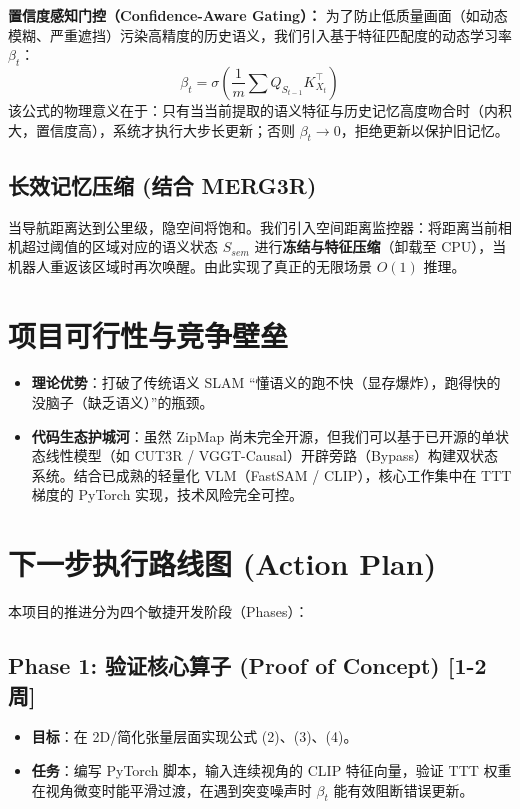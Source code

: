 \documentclass[12pt, a4paper]{article}
\begin{document}
\textbf{置信度感知门控（Confidence-Aware Gating）：}
为了防止低质量画面（如动态模糊、严重遮挡）污染高精度的历史语义，我们引入基于特征匹配度的动态学习率 $\beta_t$：
\begin{equation}
    \beta_t = \sigma \left( \frac{1}{m} \sum Q_{S_{t-1}} K_{X_t}^\top \right)
\end{equation}
该公式的物理意义在于：只有当当前提取的语义特征与历史记忆高度吻合时（内积大，置信度高），系统才执行大步长更新；否则 $\beta_t \to 0$，拒绝更新以保护旧记忆。



\subsection{长效记忆压缩 (结合 MERG3R)}
当导航距离达到公里级，隐空间将饱和。我们引入空间距离监控器：将距离当前相机超过阈值的区域对应的语义状态 $S_{sem}$ 进行\textbf{冻结与特征压缩}（卸载至 CPU），当机器人重返该区域时再次唤醒。由此实现了真正的无限场景 $O(1)$ 推理。

\section{项目可行性与竞争壁垒}
\begin{itemize}
    \item \textbf{理论优势}：打破了传统语义 SLAM “懂语义的跑不快（显存爆炸），跑得快的没脑子（缺乏语义）”的瓶颈。
    \item \textbf{代码生态护城河}：虽然 ZipMap 尚未完全开源，但我们可以基于已开源的单状态线性模型（如 CUT3R / VGGT-Causal）开辟旁路（Bypass）构建双状态系统。结合已成熟的轻量化 VLM（FastSAM / CLIP），核心工作集中在 TTT 梯度的 PyTorch 实现，技术风险完全可控。
\end{itemize}

\section{下一步执行路线图 (Action Plan)}

本项目的推进分为四个敏捷开发阶段（Phases）：

\subsection*{Phase 1: 验证核心算子 (Proof of Concept) [1-2 周]}
\begin{itemize}
    \item \textbf{目标}：在 2D/简化张量层面实现公式 (2)、(3)、(4)。
    \item \textbf{任务}：编写 PyTorch 脚本，输入连续视角的 CLIP 特征向量，验证 TTT 权重在视角微变时能平滑过渡，在遇到突变噪声时 $\beta_t$ 能有效阻断错误更新。
\end{itemize}
\end{document}
